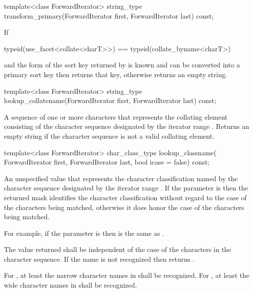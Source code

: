 %
\begin{itemdecl}
template<class ForwardIterator>
  string_type transform_primary(ForwardIterator first, ForwardIterator last) const;
\end{itemdecl}

\begin{itemdescr}
\pnum
\effects
If
\begin{codeblock}
typeid(use_facet<collate<charT>>) == typeid(collate_byname<charT>)
\end{codeblock}
and the form of the sort key returned
by  is known and
can be converted into a primary sort key then returns that key,
otherwise returns an empty string.
\end{itemdescr}

%
\begin{itemdecl}
template<class ForwardIterator>
  string_type lookup_collatename(ForwardIterator first, ForwardIterator last) const;
\end{itemdecl}

\begin{itemdescr}
\pnum
\returns
A sequence of one or more characters that
represents the collating element consisting of the character
sequence designated by the iterator range .
Returns an empty string if the character sequence is not a
valid collating element.
\end{itemdescr}

%
\begin{itemdecl}
template<class ForwardIterator>
  char_class_type lookup_classname(
    ForwardIterator first, ForwardIterator last, bool icase = false) const;
\end{itemdecl}

\begin{itemdescr}
\pnum
\returns
An unspecified value that represents
the character classification named by the character sequence
designated by the iterator range .
If the parameter  is  then the returned mask identifies the
character classification without regard to the case of the characters being
matched, otherwise it does honor the case of the characters being
matched.
\begin{footnote}
For example, if the parameter  is  then
\tcode{[[:lower:]]} is the same as \tcode{[[:alpha:]]}.
\end{footnote}
The value
returned shall be independent of the case of the characters in
the character sequence. If the name
is not recognized then returns .

\pnum
\remarks
For , at least the narrow character names
in  shall be recognized.
For , at least the wide character names
in  shall be recognized.
\end{itemdescr}

